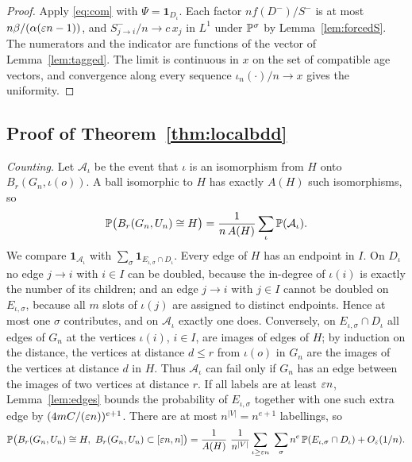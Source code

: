 \begin{proof}
Apply \eqref{eq:com} with $\Psi=\mathbf 1_{D_\iota}$. Each factor $nf(D^-)/S^-$ is at most
$n\beta/(\alpha(\varepsilon n-1))$, and $S^-_{j\to i}/n\to c\,x_j$ in $L^1$ under $\mathbb{P}^\sigma$ by
Lemma~\ref{lem:forcedS}. The numerators and the indicator are functions of the vector of
Lemma~\ref{lem:tagged}. The limit is continuous in $x$ on the set of compatible age vectors, and convergence
along every sequence $\iota_n(\cdot)/n\to x$ gives the uniformity.
\end{proof}

\subsection{Proof of Theorem~\ref{thm:localbdd}}

\emph{Counting.} Let $\mathcal A_\iota$ be the event that $\iota$ is an isomorphism from $H$ onto
$B_r(G_n,\iota(o))$. A ball isomorphic to $H$ has exactly $A(H)$ such isomorphisms, so
\begin{equation}\label{eq:count}
   \mathbb{P}\bigl(B_r(G_n,U_n)\cong H\bigr)=\frac{1}{n\,A(H)}\sum_\iota\mathbb{P}(\mathcal A_\iota).
\end{equation}
We compare $\mathbf 1_{\mathcal A_\iota}$ with $\sum_\sigma\mathbf 1_{E_{\iota,\sigma}\cap D_\iota}$. Every edge
of $H$ has an endpoint in $I$. On $D_\iota$ no edge $j\to i$ with $i\in I$ can be doubled, because the in-degree
of $\iota(i)$ is exactly the number of its children; and an edge $j\to i$ with $j\in I$ cannot be doubled on
$E_{\iota,\sigma}$, because all $m$ slots of $\iota(j)$ are assigned to distinct endpoints. Hence at most one
$\sigma$ contributes, and on $\mathcal A_\iota$ exactly one does. Conversely, on $E_{\iota,\sigma}\cap D_\iota$
all edges of $G_n$ at the vertices $\iota(i)$, $i\in I$, are images of edges of $H$; by induction on the
distance, the vertices at distance $d\le r$ from $\iota(o)$ in $G_n$ are the images of the vertices at distance
$d$ in $H$. Thus $\mathcal A_\iota$ can fail only if $G_n$ has an edge between the images of two vertices at
distance $r$. If all labels are at least $\varepsilon n$, Lemma~\ref{lem:edges} bounds the probability of
$E_{\iota,\sigma}$ together with one such extra edge by $(4mC/(\varepsilon n))^{e+1}$. There are at most
$n^{|V|}=n^{e+1}$ labellings, so
\begin{equation}\label{eq:count2}
   \mathbb{P}\bigl(B_r(G_n,U_n)\cong H,\ B_r(G_n,U_n)\subset[\varepsilon n,n]\bigr)
   =\frac{1}{A(H)}\ \frac{1}{n^{|V|}}\sum_{\iota\ge\varepsilon n}\ \sum_\sigma n^{e}\,\mathbb{P}(E_{\iota,\sigma}\cap D_\iota)+O_\varepsilon(1/n).
\end{equation}

